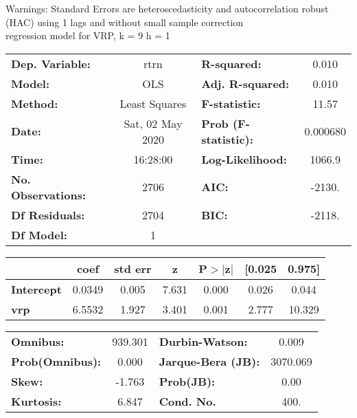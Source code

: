 Warnings: \newline
 [1] Standard Errors are heteroscedasticity and autocorrelation robust (HAC) using 1 lags and without small sample correction\\ 

regression model for VRP, k = 9 h = 1\begin{center}
\begin{tabular}{lclc}
\toprule
\textbf{Dep. Variable:}    &       rtrn       & \textbf{  R-squared:         } &     0.010   \\
\textbf{Model:}            &       OLS        & \textbf{  Adj. R-squared:    } &     0.010   \\
\textbf{Method:}           &  Least Squares   & \textbf{  F-statistic:       } &     11.57   \\
\textbf{Date:}             & Sat, 02 May 2020 & \textbf{  Prob (F-statistic):} &  0.000680   \\
\textbf{Time:}             &     16:28:00     & \textbf{  Log-Likelihood:    } &    1066.9   \\
\textbf{No. Observations:} &        2706      & \textbf{  AIC:               } &    -2130.   \\
\textbf{Df Residuals:}     &        2704      & \textbf{  BIC:               } &    -2118.   \\
\textbf{Df Model:}         &           1      & \textbf{                     } &             \\
\bottomrule
\end{tabular}
\begin{tabular}{lcccccc}
                   & \textbf{coef} & \textbf{std err} & \textbf{z} & \textbf{P$> |$z$|$} & \textbf{[0.025} & \textbf{0.975]}  \\
\midrule
\textbf{Intercept} &       0.0349  &        0.005     &     7.631  &         0.000        &        0.026    &        0.044     \\
\textbf{vrp}       &       6.5532  &        1.927     &     3.401  &         0.001        &        2.777    &       10.329     \\
\bottomrule
\end{tabular}
\begin{tabular}{lclc}
\textbf{Omnibus:}       & 939.301 & \textbf{  Durbin-Watson:     } &    0.009  \\
\textbf{Prob(Omnibus):} &   0.000 & \textbf{  Jarque-Bera (JB):  } & 3070.069  \\
\textbf{Skew:}          &  -1.763 & \textbf{  Prob(JB):          } &     0.00  \\
\textbf{Kurtosis:}      &   6.847 & \textbf{  Cond. No.          } &     400.  \\
\bottomrule
\end{tabular}
\end{center}

